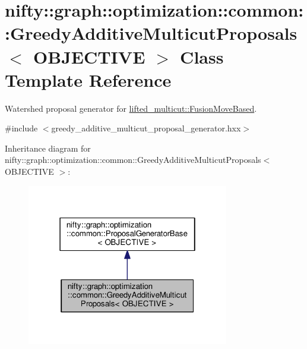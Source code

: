\hypertarget{classnifty_1_1graph_1_1optimization_1_1common_1_1GreedyAdditiveMulticutProposals}{}\section{nifty\+:\+:graph\+:\+:optimization\+:\+:common\+:\+:Greedy\+Additive\+Multicut\+Proposals$<$ O\+B\+J\+E\+C\+T\+I\+V\+E $>$ Class Template Reference}
\label{classnifty_1_1graph_1_1optimization_1_1common_1_1GreedyAdditiveMulticutProposals}


Watershed proposal generator for \hyperlink{classnifty_1_1graph_1_1optimization_1_1lifted__multicut_1_1FusionMoveBased}{lifted\+\_\+multicut\+::\+Fusion\+Move\+Based}.  




{\ttfamily \#include $<$greedy\+\_\+additive\+\_\+multicut\+\_\+proposal\+\_\+generator.\+hxx$>$}



Inheritance diagram for nifty\+:\+:graph\+:\+:optimization\+:\+:common\+:\+:Greedy\+Additive\+Multicut\+Proposals$<$ O\+B\+J\+E\+C\+T\+I\+V\+E $>$\+:\nopagebreak
\begin{figure}[H]
\begin{center}
\leavevmode
\includegraphics[width=250pt]{classnifty_1_1graph_1_1optimization_1_1common_1_1GreedyAdditiveMulticutProposals__inherit__graph}
\end{center}
\end{figure}


